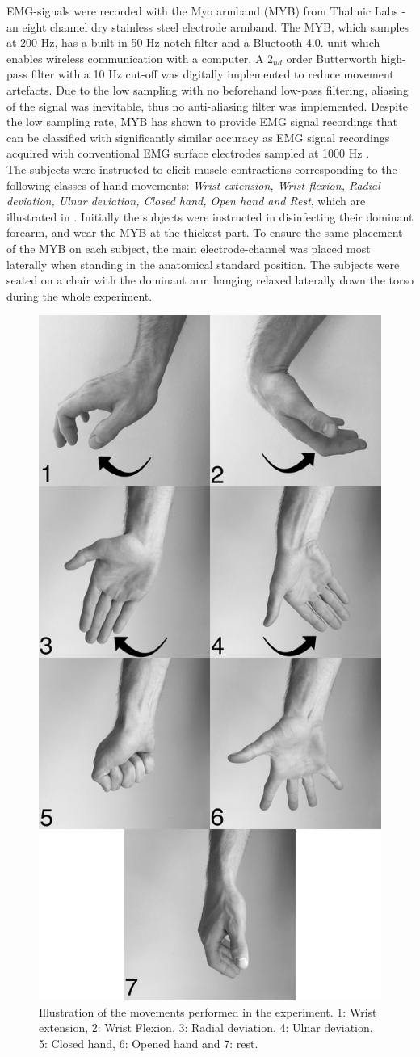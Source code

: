 EMG-signals were recorded with the Myo armband (MYB) from Thalmic Labs - an eight channel dry stainless steel electrode armband. The MYB, which samples at 200 Hz, has a built in 50 Hz notch filter and a Bluetooth 4.0. unit which enables wireless communication with a computer. A 2$_{nd}$ order Butterworth high-pass filter with a 10 Hz cut-off was digitally implemented to reduce movement artefacts. Due to the low sampling with no beforehand low-pass filtering, aliasing of the signal was inevitable, thus no anti-aliasing filter was implemented. Despite the low sampling rate, MYB has shown to provide EMG signal recordings that can be classified with significantly similar accuracy as EMG signal recordings acquired with conventional EMG surface electrodes sampled at 1000 Hz \cite{Mendez2017}. \\
The subjects were instructed to elicit muscle contractions corresponding to the following classes of hand movements: \textit{Wrist extension, Wrist flexion, Radial deviation, Ulnar deviation, Closed hand, Open hand and Rest}, which are illustrated in . Initially the subjects were instructed in disinfecting their dominant forearm, and wear the MYB at the thickest part. To ensure the same placement of the MYB on each subject, the main electrode-channel was placed most laterally when standing in the anatomical standard position. The subjects were seated on a chair with the dominant arm hanging relaxed laterally down the torso during the whole experiment. \\

\begin{figure}[H]                 
	\includegraphics[width=.4\textwidth]{figures/Paper/allHandMovementsVerticalBW}  
	\caption{Illustration of the movements performed in the experiment. 1: Wrist extension, 2: Wrist Flexion, 3: Radial deviation, 4: Ulnar deviation, 5: Closed hand, 6: Opened hand and 7: rest.}
	\label{fig:P:experiment_movements} 
\end{figure}

